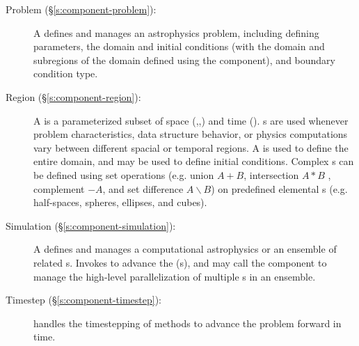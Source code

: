 \begin{description}
%
 \item [\done Problem (\S\ref{s:component-problem}): ]
%
   A  defines and manages an astrophysics problem,
   including defining  parameters, the domain and
   initial conditions (with the domain and subregions of the domain
   defined using the  component), and boundary condition
   type.
%
 \item [\done Region (\S\ref{s:component-region}): ]
%
   A  is a parameterized subset of space (,,) and
   time ().  s are used whenever problem characteristics,
   data structure behavior, or physics computations vary between
   different spacial or temporal regions.  A  is used to
   define the entire domain, and may be used to define initial
   conditions.  Complex s can be defined using set operations
   (e.g. union $A + B$, intersection $A * B$ , complement $- A$, and set
   difference $A \backslash B$) on predefined elemental s
   (e.g. half-spaces, spheres, ellipses, and cubes).
%
 \item [\done Simulation (\S\ref{s:component-simulation}): ]
%
   A  defines and manages a computational
   astrophysics  or an ensemble of related
   s. Invokes  to advance the
   (s), and may call the  component to
   manage the high-level parallelization of multiple s
   in an ensemble.
%
 \item [\todo Timestep (\S\ref{s:component-timestep}): ]
%
         handles the timestepping of methods to advance
        the problem forward in time.
\end{description}




















% 
% 
% 
% 
% 
% 
% 
% 
% 
% 
